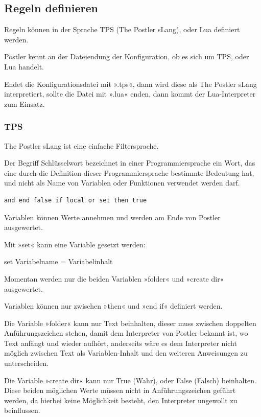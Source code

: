 \documentclass[a4paper,10pt]{article}
\newcounter{subsubsubsection}[subsubsection]
\begin{document}
\subsection{Regeln definieren}

Regeln können in der Sprache TPS (The Postler sLang), oder Lua definiert werden.

Postler kennt an der Dateiendung der Konfiguration, ob es sich um TPS, oder Lua handelt.

Endet die Konfigurationsdatei mit ».tps«, dann wird diese als The Postler sLang interpretiert, sollte die Datei mit ».lua« enden, dann kommt der Lua-Interpreter zum Einsatz.

\subsubsection{TPS}

The Postler sLang ist eine einfache Filtersprache.


Der Begriff Schlüsselwort bezeichnet in einer Programmiersprache ein Wort, das eine durch die Definition dieser Programmiersprache bestimmte Bedeutung hat, und nicht als Name von Variablen oder Funktionen verwendet werden darf.

\begin{lstlisting}
and end false if local or set then true
\end{lstlisting}


Variablen können Werte annehmen und werden am Ende von Postler ausgewertet.

Mit »set« kann eine Variable gesetzt werden:

set Variabelname = Variabelinhalt

Momentan werden nur die beiden Variablen »folder« und »create dir« ausgewertet.

Variablen können nur zwischen »then« und »end if« definiert werden.

Die Variable »folder« kann nur Text beinhalten, dieser muss zwischen doppelten Anführungszeichen stehen, damit dem Interpreter von Postler bekannt ist, wo Text anfängt und wieder aufhört, anderseits wäre es dem Interpreter nicht möglich zwischen Text als Variablen-Inhalt und den weiteren Anweisungen zu unterscheiden.

Die Variable »create dir« kann nur True (Wahr), oder False (Falsch) beinhalten. Diese beiden möglichen Werte müssen nicht in Anführungszeichen geführt werden, da hierbei keine Möglichkeit besteht, den Interpreter ungewollt zu beinflussen.
\end{document}
